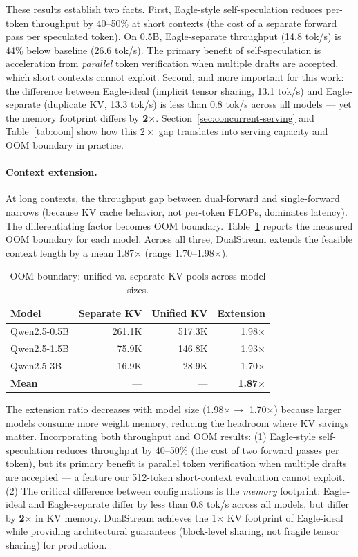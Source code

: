 \documentclass[review]{elsarticle}
\theoremstyle{definition}
\theoremstyle{remark}
\begin{document}
These results establish two facts. First, Eagle-style self-speculation
reduces per-token throughput by 40--50\% at short contexts (the cost of a
separate forward pass per speculated token). On 0.5B, Eagle-separate
throughput (14.8 tok/s) is 44\% below baseline (26.6 tok/s). The primary
benefit of self-speculation is acceleration from \emph{parallel} token
verification when multiple drafts are accepted, which short contexts cannot
exploit. Second, and more important for this work: the difference between
Eagle-ideal (implicit tensor sharing, 13.1 tok/s) and Eagle-separate
(duplicate KV, 13.3 tok/s) is less than 0.8 tok/s across all models --- yet
the memory footprint differs by \textbf{2$\times$}. Section~\ref{sec:concurrent-serving} and Table~\ref{tab:oom} show how this $2\times$ gap translates
into serving capacity and OOM boundary in practice.

\paragraph{Context extension.}
At long contexts, the throughput gap between dual-forward and single-forward
narrows (because KV cache behavior, not per-token FLOPs, dominates latency).
The differentiating factor becomes OOM boundary. Table~\ref{tab:sota-oom}
reports the measured OOM boundary for each model. Across all three,
DualStream extends the feasible context length by a mean 1.87$\times$
(range 1.70--1.98$\times$).

\begin{table}[t]
\centering
\caption{OOM boundary: unified vs. separate KV pools across model sizes.}
\label{tab:sota-oom}
\begin{tabular}{lrrr}
\toprule
\textbf{Model} & \textbf{Separate KV} & \textbf{Unified KV} & \textbf{Extension} \\
\midrule
Qwen2.5-0.5B & 261.1K & 517.3K & 1.98$\times$ \\
Qwen2.5-1.5B & 75.9K  & 146.8K & 1.93$\times$ \\
Qwen2.5-3B   & 16.9K  & 28.9K  & 1.70$\times$ \\
\midrule
\textbf{Mean} & --- & --- & \textbf{1.87$\times$} \\
\bottomrule
\end{tabular}
\end{table}

The extension ratio decreases with model size (1.98$\times \to$ 1.70$\times$)
because larger models consume more weight memory, reducing the headroom where
KV savings matter. Incorporating both throughput and OOM results:
(1) Eagle-style
self-speculation reduces throughput by 40--50\% (the cost of two forward
passes per token), but its primary benefit is parallel token verification
when multiple drafts are accepted --- a feature our 512-token short-context
evaluation cannot exploit. (2) The critical difference between configurations
is the \emph{memory} footprint: Eagle-ideal and Eagle-separate
differ by less than 0.8 tok/s across all models, but differ by
\textbf{2$\times$} in KV memory. DualStream achieves the 1$\times$ KV
footprint of Eagle-ideal while providing architectural guarantees
(block-level sharing, not fragile tensor sharing) for production.
\end{document}
